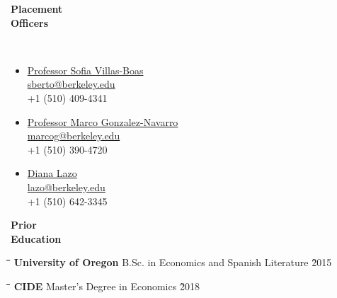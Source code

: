 \documentclass[10pt, oneside]{article}
\newcommand\mytabs{\hspace*{1cm}\=\hspace{1cm}\=\hspace{1cm}\=\hspace{1cm}\=\hspace{1cm}\=\hspace{1cm}\=\hspace{1cm}\=\hspace{1cm}\=\hspace{1cm}\=\hspace{1cm}}
\newenvironment{mysec}[1][\mytabs]
  {\begin{tabbing}#1\kill\ignorespaces}
  {\end{tabbing}}
\begin{document}
\begin{minipage}[t]{0.1\linewidth}
\textbf{Placement\\ Officers}
\end{minipage}\hspace{0.04\linewidth}
\begin{minipage}[t]{0.9\linewidth}~\vspace{-9mm}
\begin{multicols}{3}
\begin{itemize}[noitemsep,nolistsep]
\item[] \underline{Professor Sofia Villas-Boas} \\
\href{mailto:sberto@berkeley.edu}{sberto@berkeley.edu} \\
+1 (510) 409-4341 \\
\item[] \underline{Professor Marco Gonzalez-Navarro} \\
\href{mailto:marcog@berkeley.edu}{marcog@berkeley.edu} \\
+1 (510) 390-4720 \\
\item[] \underline{Diana Lazo} \\
\href{mailto:lazo@berkeley.edu}{lazo@berkeley.edu} \\
+1 (510) 642-3345 
\end{itemize}
\end{multicols}
\end{minipage}\vspace{5mm}

\begin{minipage}[t]{0.1\linewidth}
\textbf{Prior \\ Education}
\end{minipage}\hspace{0.05\linewidth}
\begin{minipage}[t]{0.8\linewidth}
\begin{mysec} 
\textbf{University of Oregon} \>\>\>\>\> B.Sc. in Economics and Spanish Literature \` 2015 
\end{mysec} 
\begin{mysec} 
    \textbf{CIDE} \>\>\>\>\> Master's Degree in Economics \` 2018
    \end{mysec} 
\end{minipage}\vspace{5mm}
\end{document}
